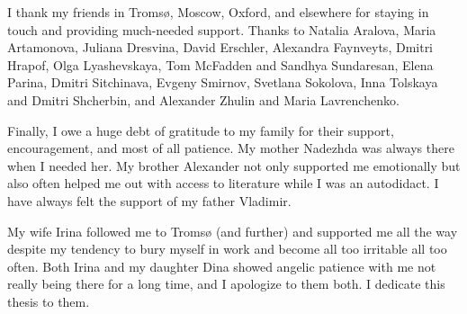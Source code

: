 I thank my friends in Tromsø, Moscow, Oxford, and elsewhere for staying in touch and providing much\hyp needed support. Thanks to Natalia Aralova, Maria Artamonova, Juliana Dresvina, David Erschler, Alexandra Faynveyts, Dmitri Hrapof, Olga Lyashevskaya, Tom McFadden and Sandhya Sundaresan, Elena Parina, Dmitri Sitchinava, Evgeny Smirnov, Svetlana Sokolova, Inna Tolskaya and Dmitri Shcherbin, and Alexander Zhulin and Maria Lavrenchenko.

Finally, I owe a huge debt of gratitude to my family for their support, encouragement, and most of all patience. My mother Nadezhda was always there when I needed her. My brother Alexander not only supported me emotionally but also often helped me out with access to literature while I was an autodidact. I have always felt the support of my father Vladimir.

My wife Irina followed me to Tromsø (and further) and supported me all the way despite my tendency to bury myself in work and become all too irritable all too often. Both Irina and my daughter Dina showed angelic patience with me not really being there for a long time, and I apologize to them both. I dedicate this thesis to them.